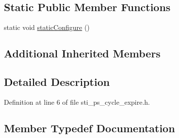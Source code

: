 \subsection*{Static Public Member Functions}
\begin{DoxyCompactItemize}
\item 
static void \hyperlink{structsm__respira__1_1_1ps__cycle__inner__states_1_1StiPSCycleExpire_ab76869554f2e9a2b0fcf782d53fcb798}{static\+Configure} ()
\end{DoxyCompactItemize}
\subsection*{Additional Inherited Members}


\subsection{Detailed Description}


Definition at line 6 of file sti\+\_\+ps\+\_\+cycle\+\_\+expire.\+h.



\subsection{Member Typedef Documentation}
\mbox{\label{structsm__respira__1_1_1ps__cycle__inner__states_1_1StiPSCycleExpire_af06d5dccfc337830ff4b17405ff4ee7a}} 
